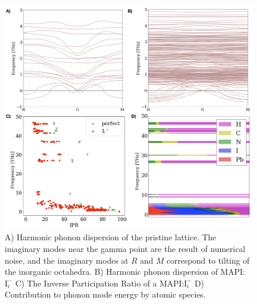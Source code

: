 \begin{figure}[h!]   
\centering
  \includegraphics[width=1.0\columnwidth]{figures/ch6/defect_dispersion_IPR.png}
  \caption[Phonon dispersion and Inverse Participation Ratio of a MAPI crystal containing $\mathbf{I}_i^{-}$]{A) Harmonic phonon dispersion of the pristine lattice. The imaginary modes near the gamma point are the result of numerical noise, and the imaginary modes at $R$ and $M$ correspond to tilting of the inorganic octahedra. B) Harmonic phonon dispersion of MAPI:$\mathrm{I}_i^{-}$ C) The Inverse Participation Ratio of a MAPI:$\mathrm{I}_i^{-}$ D) Contribution to phonon mode energy by atomic species.}
\label{defect_dispersion_IPR}
\end{figure}

